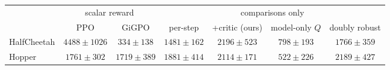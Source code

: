 \begin{tabular}{lcccccc}
\toprule
 & \multicolumn{2}{c}{scalar reward} & \multicolumn{4}{c}{comparisons only} \\
\cmidrule(lr){2-3}\cmidrule(lr){4-7}
 & PPO & GiGPO & per-step & +critic (ours) & model-only $Q$ & doubly robust \\
\midrule
HalfCheetah & $4488\pm1026$ & $334\pm138$ & $1481\pm162$ & $2196\pm523$ & $798\pm193$ & $1766\pm359$ \\
Hopper & $1761\pm302$ & $1719\pm389$ & $1881\pm414$ & $2114\pm171$ & $522\pm226$ & $2189\pm427$ \\
\bottomrule
\end{tabular}
